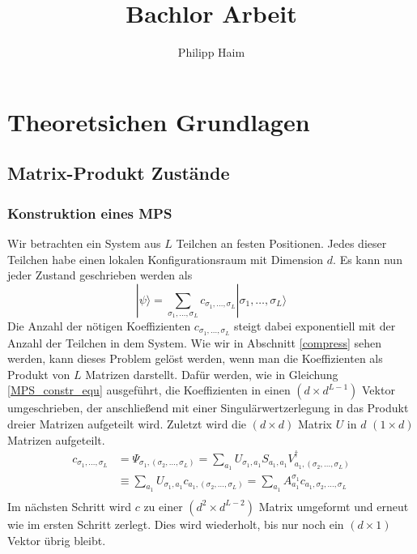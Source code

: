 \documentclass[10pt,a4paper]{report}
\author{Philipp Haim}
\title{Bachlor Arbeit}
\newcommand{\SumIndex}{\sigma_1,\ldots,\sigma_L}
\begin{document}
\maketitle

\part{Theoretsichen Grundlagen}

\chapter{Matrix-Produkt Zustände}

\section{Konstruktion eines MPS}\label{construction}
Wir betrachten ein System aus $L$ Teilchen an festen Positionen. Jedes dieser Teilchen habe einen lokalen Konfigurationsraum mit Dimension $d$. Es kann nun jeder Zustand geschrieben werden als
\begin{equation}\label{psi_equ}
|\psi\rangle=\sum_{\SumIndex} c_{\SumIndex}|\SumIndex\rangle
\end{equation}
Die Anzahl der nötigen Koeffizienten $c_{\sigma_1,\ldots,\sigma_L}$ steigt dabei exponentiell mit der Anzahl der Teilchen in dem System.
Wie wir in Abschnitt \ref{compress} sehen werden, kann dieses Problem gelöst werden, wenn man die Koeffizienten als Produkt von $L$ Matrizen darstellt. Dafür werden, wie in Gleichung \ref{MPS_constr_equ} ausgeführt, die Koeffizienten in einen $(d\times d^{L-1})$ Vektor umgeschrieben, der anschließend mit einer Singulärwertzerlegung in das Produkt dreier Matrizen aufgeteilt wird. Zuletzt wird die $(d\times d)$ Matrix $U$ in $d$ $(1\times d)$ Matrizen aufgeteilt. 
\begin{equation}
\label{MPS_constr_equ}
\begin{split}
c_{\SumIndex}&=\Psi_{\sigma_1,(\sigma_2,\ldots,\sigma_L)} =\sum_{a_1}U_{\sigma_1,a_1}S_{a_1,a_1}V^\dagger_{a_1,(\sigma_2,\ldots,\sigma_L)} \\
&\equiv\sum_{a_1}U_{\sigma_1,a_1}c_{a_1,(\sigma_2,\ldots,\sigma_L)}=\sum_{a_1}A_{a_1}^{\sigma_1}c_{a_1,\sigma_2,\ldots,\sigma_L} \\
\end{split}
\end{equation}
Im nächsten Schritt wird $c$ zu einer $(d^2 \times d^{L-2})$ Matrix umgeformt und erneut wie im ersten Schritt zerlegt. Dies wird wiederholt, bis nur noch ein $(d\times 1)$ Vektor übrig bleibt.
\end{document}
